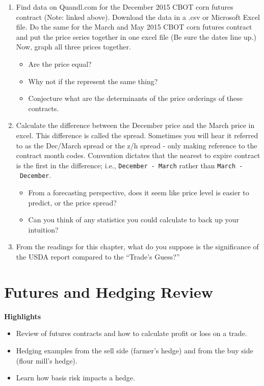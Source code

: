 \documentclass[
]{book}
\providecommand{\tightlist}{%
  \setlength{\itemsep}{0pt}\setlength{\parskip}{0pt}}
\begin{document}
\begin{enumerate}
\def\labelenumi{\arabic{enumi}.}
\item
  Find data on Quandl.com for the December 2015 CBOT corn futures contract (Note: linked above). Download the data in a .csv or Microsoft Excel file. Do the same for the March and May 2015 CBOT corn futures contract and put the price series together in one excel file (Be sure the dates line up.) Now, graph all three prices together.

  \begin{itemize}
  \tightlist
  \item
    Are the price equal?
  \item
    Why not if the represent the same thing?
  \item
    Conjecture what are the determinants of the price orderings of these contracts.
  \end{itemize}
\item
  Calculate the difference between the December price and the March price in excel. This difference is called the spread. Sometimes you will hear it referred to as the Dec/March spread or the z/h spread - only making reference to the contract month codes. Convention dictates that the nearest to expire contract is the first in the difference; i.e., \texttt{December\ -\ March} rather than \texttt{March\ -\ December}.

  \begin{itemize}
  \tightlist
  \item
    From a forecasting perspective, does it seem like price level is easier to predict, or the price spread?
  \item
    Can you think of any statistics you could calculate to back up your intuition?
  \end{itemize}
\item
  From the readings for this chapter, what do you suppose is the significance of the USDA report compared to the ``Trade's Guess?''
\end{enumerate}

\hypertarget{futures-and-hedging-review}{%
\chapter{Futures and Hedging Review}\label{futures-and-hedging-review}}

\textbf{Highlights}

\begin{itemize}
\tightlist
\item
  Review of futures contracts and how to calculate profit or loss on a trade.
\item
  Hedging examples from the sell side (farmer's hedge) and from the buy side (flour mill's hedge).
\item
  Learn how basis risk impacts a hedge.
\end{itemize}
\end{document}
